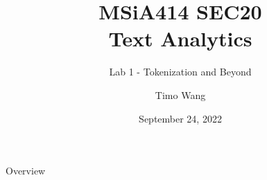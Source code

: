 \documentclass{beamer}
\begin{document}
\title{MSiA414 SEC20\\ Text Analytics}
\subtitle{Lab 1 - Tokenization and Beyond}
\author{Timo Wang}
\date{September 24, 2022}

\begin{frame}
    \titlepage
\end{frame}

\begin{frame}{Overview}
    \tableofcontents[hideallsubsections]
\end{frame}

\end{document}
